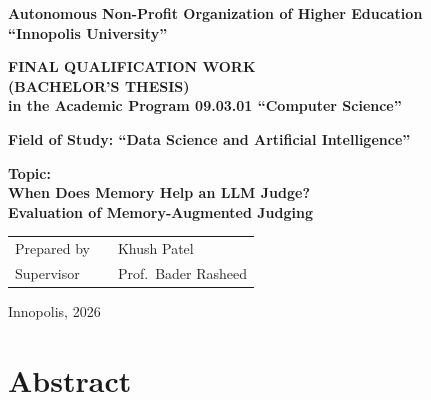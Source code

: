 \documentclass[14pt,a4paper]{extreport}
\begin{document}
\thispagestyle{empty}
\begin{titlepage}
\begin{center}
{\bfseries Autonomous Non-Profit Organization of Higher Education\\
``Innopolis University''}
\vspace{1.0cm}

{\bfseries FINAL QUALIFICATION WORK\\(BACHELOR'S THESIS)\\
in the Academic Program 09.03.01 ``Computer Science''}
\vspace{0.5cm}

{\bfseries Field of Study: ``Data Science and Artificial Intelligence''}
\vspace{1.5cm}

{\large \textbf{Topic:}}\\[0.4cm]
{\Large \textbf{When Does Memory Help an LLM Judge?\\
Evaluation of Memory-Augmented Judging}}
\vspace{2.5cm}

\begin{flushleft}
\hspace{1cm}\begin{tabular}{@{}p{5cm}p{4cm}p{4cm}@{}}
Prepared by & \hrulefill & Khush Patel \\[1.0cm]
Supervisor & \hrulefill & Prof.\ Bader Rasheed \\
\end{tabular}
\end{flushleft}
\vfill
{\normalsize Innopolis, 2026}
\end{center}
\end{titlepage}

\chapter*{Abstract}
\end{document}

